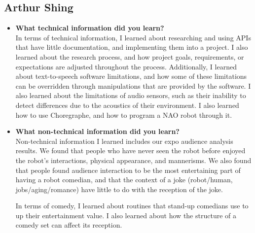 \subsection{Arthur Shing}
\begin{itemize}
\item{\textbf{What technical information did you learn?}} \\
  In terms of technical information, I learned about researching and using APIs that have little documentation, and implementing them into a project. I also learned about the research process, and how project goals, requirements, or expectations are adjusted throughout the process.
  Additionally, I learned about text-to-speech software limitations, and how some of these limitations can be overridden through manipulations that are provided by the software.
  I also learned about the limitations of audio sensors, such as their inability to detect differences due to the acoustics of their environment. I also learned how to use Choregraphe, and how to program a NAO robot through it.
\item{\textbf{What non-technical information did you learn?}} \\
  Non-technical information I learned includes our expo audience analysis results. We found that people who have never seen the robot before enjoyed the robot's interactions, physical appearance, and mannerisms. We also found that people found audience interaction to be the most entertaining part of having a robot comedian, and that the context of a joke (robot/human, jobs/aging/romance) have little to do with the reception of the joke.

  In terms of comedy, I learned about routines that stand-up comedians use to up their entertainment value. I also learned about how the structure of a comedy set can affect its reception.


\end{itemize}
